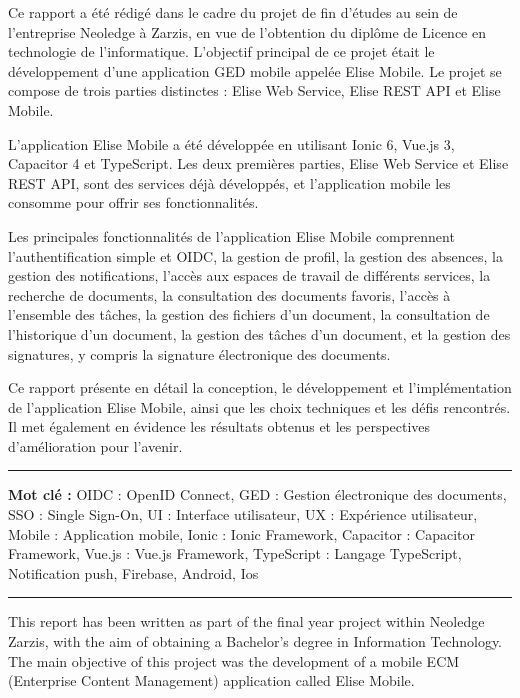 
Ce rapport a été rédigé dans le cadre du projet de fin d'études au sein de l'entreprise Neoledge à Zarzis, en vue de l'obtention du diplôme de Licence en technologie de l'informatique. L'objectif principal de ce projet était le développement d'une application GED mobile appelée Elise Mobile. Le projet se compose de trois parties distinctes  : Elise Web Service, Elise REST API et Elise Mobile.

L'application Elise Mobile a été développée en utilisant Ionic 6, Vue.js 3, Capacitor 4 et TypeScript. Les deux premières parties, Elise Web Service et Elise REST API, sont des services déjà développés, et l'application mobile les consomme pour offrir ses fonctionnalités.

Les principales fonctionnalités de l'application Elise Mobile comprennent l'authentification simple et OIDC, la gestion de profil, la gestion des absences, la gestion des notifications, l'accès aux espaces de travail de différents services, la recherche de documents, la consultation des documents favoris, l'accès à l'ensemble des tâches, la gestion des fichiers d'un document, la consultation de l'historique d'un document, la gestion des tâches d'un document, et la gestion des signatures, y compris la signature électronique des documents.

Ce rapport présente en détail la conception, le développement et l'implémentation de l'application Elise Mobile, ainsi que les choix techniques et les défis rencontrés. Il met également en évidence les résultats obtenus et les perspectives d'amélioration pour l'avenir.

\vspace{1cm}



\noindent\rule[2pt]{\textwidth}{0.5pt}

{\textbf{Mot clé :}}
OIDC : OpenID Connect, GED : Gestion électronique des documents, SSO : Single Sign-On, UI : Interface utilisateur, UX : Expérience utilisateur, Mobile : Application mobile, Ionic : Ionic Framework, Capacitor : Capacitor Framework, Vue.js : Vue.js Framework, TypeScript : Langage TypeScript, Notification push, Firebase, Android, Ios
\\
\noindent\rule[2pt]{\textwidth}{0.5pt}

This report has been written as part of the final year project within Neoledge Zarzis, with the aim of obtaining a Bachelor's degree in Information Technology. The main objective of this project was the development of a mobile ECM (Enterprise Content Management) application called Elise Mobile.

